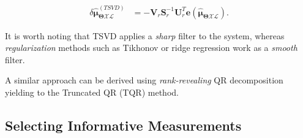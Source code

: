 \begin{equation}\label{eqn:dx_tsvd_solve}
  \begin{aligned}
  \delta\hat{\boldsymbol{\mu}}_{\boldsymbol{\Theta}\mathcal{X}\mathcal{L}}^
    {(TSVD)} &=
    -\mathbf{V}_r\mathbf{S}_r^{-1}\mathbf{U}_r^T
    \mathbf{e}(
    \mathbf{\hat{\boldsymbol{\mu}}_{
    \boldsymbol{\Theta}\mathcal{X}\mathcal{L}}}).
  \end{aligned}
\end{equation}

It is worth noting that TSVD applies a \emph{sharp} filter to the system,
whereas \emph{regularization} methods such as Tikhonov or ridge regression work
as a \emph{smooth} filter.

A similar approach can be derived using \emph{rank-revealing} QR decomposition
yielding to the Truncated QR (TQR) method.

\subsection{Selecting Informative Measurements}

